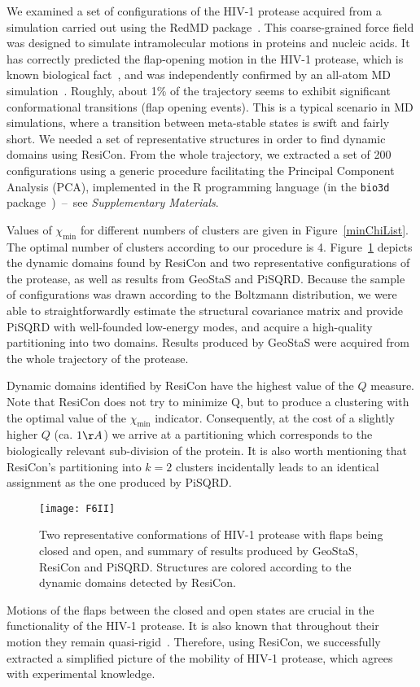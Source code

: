 \documentclass[a4paper,11pt,twoside]{book}%
\begin{document}
We examined a set of configurations of the HIV-1 protease acquired from a simulation carried out using the RedMD package~\cite{gorecki2009redmd}.
This coarse-grained force field was designed to simulate intramolecular motions in proteins and nucleic acids.
It has correctly predicted the flap-opening motion in the HIV-1 protease, which is known biological fact~\cite{hamelberg2005fast}, and was independently confirmed by an all-atom MD simulation~\cite{sadiq2010explicit}.
Roughly, about 1\% of the trajectory seems to exhibit significant conformational transitions (flap opening events).
This is a typical scenario in MD simulations, where a transition between meta-stable states is swift and fairly short.
We needed a set of representative structures in order to find dynamic domains using ResiCon.
From the whole trajectory, we extracted a set of 200 configurations using a generic procedure facilitating the Principal Component Analysis (PCA), implemented in the R programming language (in the \texttt{bio3d} package~\cite{grant2006bio3d})~--~see \emph{Supplementary Materials}.

Values of $\chi_\text{min}$ for different numbers of clusters are given in Figure~\ref{minChiList}.
The optimal number of clusters according to our procedure is 4.
Figure~\ref{hiv} depicts the dynamic domains found by ResiCon and two representative configurations of the protease, as well as results from GeoStaS and PiSQRD.
Because the sample of configurations was drawn according to the Boltzmann distribution, we were able to straightforwardly estimate the structural covariance matrix and provide PiSQRD with well-founded low-energy modes, and acquire a high-quality partitioning into two domains.
Results produced by GeoStaS were acquired from the whole trajectory of the protease.

Dynamic domains identified by ResiCon have the highest value of the $Q$ measure.
Note that ResiCon does not try to minimize Q, but to produce a clustering with the optimal value of the $\chi_\text{min}$ indicator.
Consequently, at the cost of a slightly higher $Q$ (ca. $1\AA$) we arrive at a partitioning which corresponds to the biologically relevant sub-division of the protein.
It is also worth mentioning that ResiCon's partitioning into $k=2$ clusters incidentally leads to an identical assignment as the one produced by PiSQRD.

\begin{figure}
\centering
\texttt{[image: F6II]}
\caption{
Two representative conformations of HIV-1 protease with flaps being closed and open, and summary of results produced by GeoStaS, ResiCon and PiSQRD.
Structures are colored according to the dynamic domains detected by ResiCon.
}
\label{hiv}
\end{figure}
Motions of the flaps between the closed and open states are crucial in the functionality of the HIV-1 protease.
It is also known that throughout their motion they remain quasi-rigid~\cite{freedberg2002rapid}.
Therefore, using ResiCon, we successfully extracted a simplified picture of the mobility of HIV-1 protease, which agrees with experimental knowledge.
\end{document}
